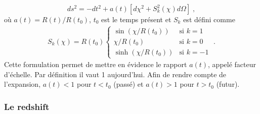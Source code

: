 \begin{equation}
  \label{eq:metrique2}
  ds^2 = - dt^2 + a(t)\left[ d\chi^2 + S_{k}^2(\chi) d\Omega \right] \; ,
\end{equation}
où $a(t) = R(t) / R(t_0)$,  $t_0$ est le temps présent et $S_{k}$ est défini comme
\begin{align}
  S_{k}(\chi) = R(t_0) \left\{
    \begin{array}{ll}
      \sin(\chi / R(t_0)) & \mbox{si } k = 1 \\
      \chi / R(t_0) & \textrm{si } k = 0 \\
      \sinh(\chi / R(t_0)) & \mbox{si } k = -1
    \end{array}
\right.  \; .
\end{align}
Cette formulation permet de mettre en évidence le rapport $a(t)$, appelé facteur d'échelle. Par définition il vaut 1 aujourd'hui. Afin de rendre compte de l'expansion, $a(t) < 1$ pour $t < t_0$ (passé) et $a(t) > 1$ pour $t > t_0$ (futur).

\subsubsection{Le redshift}
\label{par:redshift}


